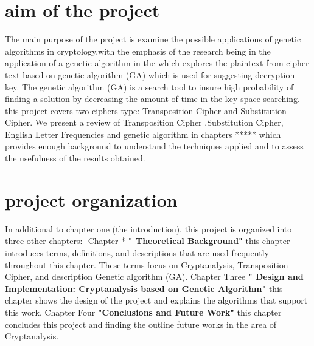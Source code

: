 \section{aim of the project}
The main purpose of the project is examine the possible applications of genetic
algorithms in cryptology,with the emphasis of the research being in the application of a genetic algorithm in the  which explores the
plaintext from cipher text based on genetic algorithm (GA) which is used
for suggesting decryption key. The genetic algorithm (GA) is a search tool
to insure high probability of finding a solution by decreasing the amount
of time in the key space searching.
this project covers two ciphers type: Transposition Cipher and Substitution Cipher. 
We present a review of Transposition Cipher ,Substitution Cipher, English Letter Frequencies and genetic algorithm in chapters ***** which provides
enough background to understand the techniques applied and to assess the
usefulness of the results obtained.
\section{project organization}
In additional to chapter one (the introduction), this project is
organized into three other chapters:
-Chapter * \textbf{" Theoretical Background"} this chapter introduces terms,
definitions, and descriptions that are used frequently throughout this
chapter. These terms focus on Cryptanalysis, Transposition Cipher, and
description Genetic algorithm (GA).
Chapter Three \textbf{" Design and Implementation: Cryptanalysis based on
Genetic Algorithm"} this chapter shows the design of the project and
explains the algorithms that support this work.
Chapter Four \textbf{"Conclusions and Future Work"} this chapter concludes
this project and finding the outline future works in the area of
Cryptanalysis.
\newpage
